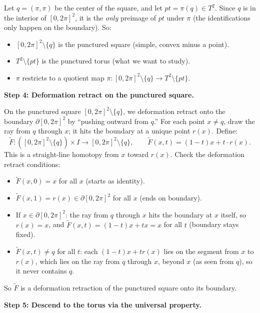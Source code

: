 \documentclass[11pt]{report}
\begin{document}
\begin{exbox}
Let $q = (\pi, \pi)$ be the center of the square, and let $pt = \pi(q) \in T^2$. Since $q$ is in the interior of $[0, 2\pi]^2$, it is the \emph{only} preimage of $pt$ under $\pi$ (the identifications only happen on the boundary). So:
\begin{itemize}[nosep]
    \item $[0, 2\pi]^2 \setminus \{q\}$ is the punctured square (simple, convex minus a point).
    \item $T^2 \setminus \{pt\}$ is the punctured torus (what we want to study).
    \item $\pi$ restricts to a quotient map $\pi: [0, 2\pi]^2 \setminus \{q\} \to T^2 \setminus \{pt\}$.
\end{itemize}

\textbf{Step 4: Deformation retract on the punctured square.}

On the punctured square $[0, 2\pi]^2 \setminus \{q\}$, we deformation retract onto the boundary $\partial[0, 2\pi]^2$ by ``pushing outward from $q$.'' For each point $x \neq q$, draw the ray from $q$ through $x$; it hits the boundary at a unique point $r(x)$. Define:
\[\tilde{F}: ([0, 2\pi]^2 \setminus \{q\}) \times I \to [0, 2\pi]^2 \setminus \{q\}, \qquad \tilde{F}(x, t) = (1-t)x + t \cdot r(x).\]
This is a straight-line homotopy from $x$ toward $r(x)$. Check the deformation retract conditions:
\begin{itemize}[nosep]
    \item $\tilde{F}(x, 0) = x$ for all $x$ (starts as identity). \checkmark
    \item $\tilde{F}(x, 1) = r(x) \in \partial[0, 2\pi]^2$ for all $x$ (ends on boundary). \checkmark
    \item If $x \in \partial[0, 2\pi]^2$: the ray from $q$ through $x$ hits the boundary at $x$ itself, so $r(x) = x$, and $\tilde{F}(x, t) = (1-t)x + tx = x$ for all $t$ (boundary stays fixed). \checkmark
    \item $\tilde{F}(x, t) \neq q$ for all $t$: each $(1-t)x + tr(x)$ lies on the segment from $x$ to $r(x)$, which lies on the ray from $q$ through $x$, beyond $x$ (as seen from $q$), so it never contains $q$. \checkmark
\end{itemize}
So $\tilde{F}$ is a deformation retraction of the punctured square onto its boundary.

\textbf{Step 5: Descend to the torus via the universal property.}


\end{exbox}
\end{document}
